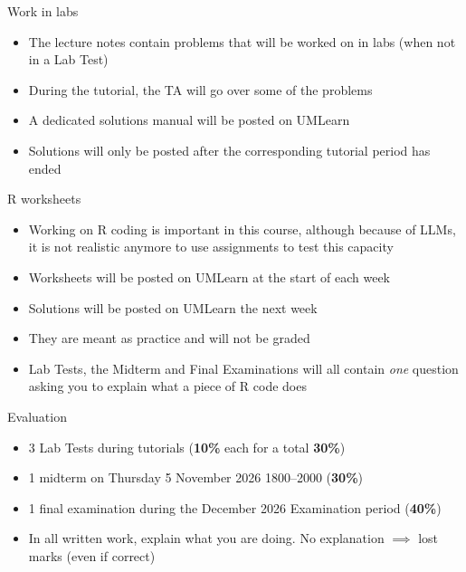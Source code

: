 \documentclass[aspectratio=169]{beamer}\usepackage[]{graphicx}\usepackage[]{xcolor}
\begin{document}
\begin{frame}{Work in labs}
\begin{itemize}
\item The lecture notes contain problems that will be worked on in labs (when not in a Lab Test)
\vfill
\item During the tutorial, the TA will go over some of the problems
\vfill
\item A dedicated solutions manual will be posted on UMLearn 
\vfill
\item Solutions will only be posted after the corresponding tutorial period has ended
\end{itemize}
\end{frame}


\begin{frame}{R worksheets}
\begin{itemize}
\item Working on R coding is important in this course, although because of LLMs, it is not realistic anymore to use assignments to test this capacity
\vfill
\item Worksheets will be posted on UMLearn at the start of each week
\vfill
\item Solutions will be posted on UMLearn the next week
\vfill
\item They are meant as practice and will not be graded
\vfill
\item Lab Tests, the Midterm and Final Examinations will all contain \emph{one} question asking you to explain what a piece of R code does
\end{itemize}
\end{frame}


\begin{frame}{Evaluation}
\begin{itemize}
\item 3 Lab Tests during tutorials (\textbf{10\%} each for a total \textbf{30\%})
\vfill
\item 1 midterm on Thursday 5 November 2026 1800--2000 (\textbf{30\%})
\vfill
\item 1 final examination during the December 2026 Examination period (\textbf{40\%})
\end{itemize}
\vfill
\begin{itemize}
\item In all written work, explain what you are doing. No explanation $\implies$ lost marks (even if correct)
\end{itemize}
\end{frame}
\end{document}
